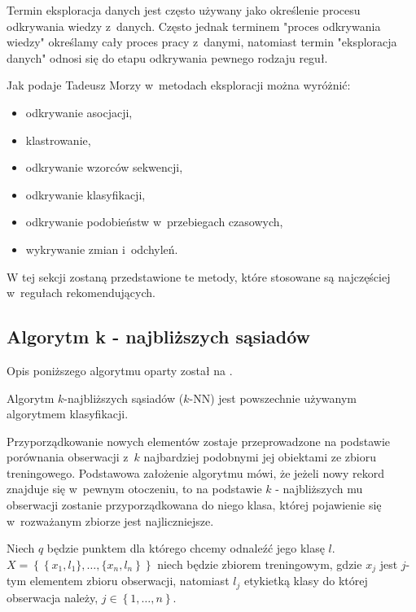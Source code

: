 \documentclass[12pt,a4paper]{report}
\newcommand{\set}[1]{\left\lbrace {#1} \right\rbrace}
\begin{document}
Termin eksploracja danych jest często używany jako określenie procesu odkrywania wiedzy z~danych. Często jednak terminem  "proces odkrywania wiedzy" określamy cały proces pracy z~danymi, natomiast termin "eksploracja danych" odnosi się do etapu odkrywania pewnego rodzaju reguł.

Jak podaje Tadeusz Morzy \citep{edmia} w~metodach eksploracji można wyróżnić:
\begin{itemize}
\item odkrywanie asocjacji,
\item klastrowanie,
\item odkrywanie wzorców sekwencji,
\item odkrywanie klasyfikacji,
\item odkrywanie podobieństw w~przebiegach czasowych,
\item wykrywanie zmian i~odchyleń.
\end{itemize}

W tej sekcji zostaną przedstawione te metody, które stosowane są najczęściej w~regułach rekomendujących.


\subsection{Algorytm k - najbliższych sąsiadów }
Opis poniższego algorytmu oparty został na {\citep[Sec 2.3.1]{rsh}}.

Algorytm $k$-najbliższych sąsiadów ($k$-NN) jest powszechnie używanym algorytmem klasyfikacji.
 
Przyporządkowanie nowych elementów zostaje przeprowadzone na podstawie porównania obserwacji z~$k$ najbardziej podobnymi jej obiektami ze zbioru treningowego. Podstawowa założenie algorytmu mówi, że jeżeli nowy rekord znajduje się w~pewnym otoczeniu, to na podstawie $k$ - najbliższych mu obserwacji zostanie przyporządkowana do niego klasa, której pojawienie się w~rozważanym zbiorze jest najliczniejsze.

Niech $q$ będzie punktem dla którego chcemy odnaleźć jego klasę $l$. 
\\$\mathit{X}=\set{\set{x_1,l_1\},\ldots,\{x_n,l_n}}$ niech będzie zbiorem treningowym, gdzie $x_j$ jest $j$-tym elementem zbioru obserwacji, natomiast $l_j$ etykietką klasy do której obserwacja należy, $j\in\set{1,\ldots,n}$.
\end{document}
